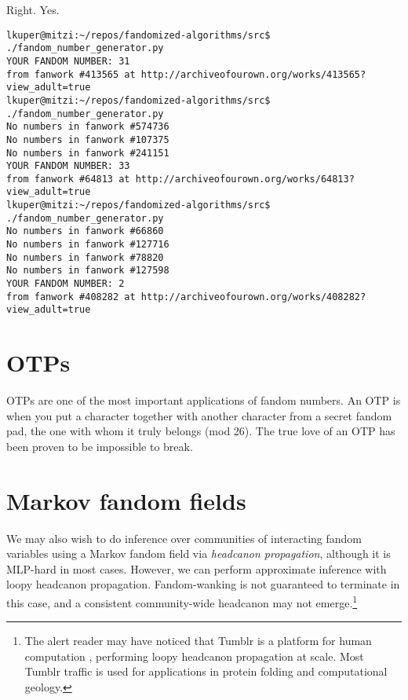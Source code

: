 \documentclass[9pt]{sigplanconf}
\begin{document}
Right. Yes.

\begin{lstlisting}
lkuper@mitzi:~/repos/fandomized-algorithms/src$ ./fandom_number_generator.py 
YOUR FANDOM NUMBER: 31
from fanwork #413565 at http://archiveofourown.org/works/413565?view_adult=true
lkuper@mitzi:~/repos/fandomized-algorithms/src$ ./fandom_number_generator.py 
No numbers in fanwork #574736
No numbers in fanwork #107375
No numbers in fanwork #241151
YOUR FANDOM NUMBER: 33
from fanwork #64813 at http://archiveofourown.org/works/64813?view_adult=true
lkuper@mitzi:~/repos/fandomized-algorithms/src$ ./fandom_number_generator.py 
No numbers in fanwork #66860
No numbers in fanwork #127716
No numbers in fanwork #78820
No numbers in fanwork #127598
YOUR FANDOM NUMBER: 2
from fanwork #408282 at http://archiveofourown.org/works/408282?view_adult=true
\end{lstlisting}

\section{OTPs}

OTPs are one of the most important applications of fandom numbers.  An
OTP is when you put a character together with another character from a
secret fandom pad, the one with whom it truly belongs (mod 26).  The
true love of an OTP has been proven to be impossible to break.

\section{Markov fandom fields}

We may also wish to do inference over communities of interacting
fandom variables using a Markov fandom field via \emph{headcanon
  propagation}, although it is MLP-hard in most cases.  However, we
can perform approximate inference with loopy headcanon propagation.
Fandom-wanking is not guaranteed to terminate in this case, and a
consistent community-wide headcanon may not emerge.\footnote{The alert
  reader may have noticed that Tumblr is a platform for
  human computation \cite{luisvonahn}, performing loopy
  headcanon propagation at scale. Most Tumblr traffic is used for
  applications in protein folding and computational geology.}



\end{document}
